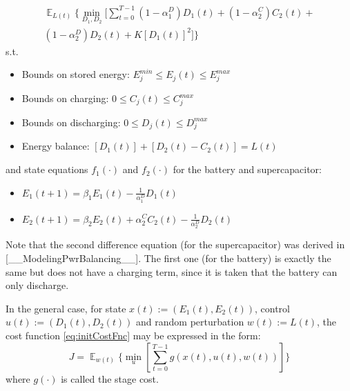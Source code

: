 \documentclass[conference]{IEEEtran}
\DeclareMathOperator{\E}{\mathbb{E}}
\begin{document}
\begin{multline} \label{eq:initCostFnc}
    \mathop{\E}_{L(t)} \Biggl\{\min_{D_{1},D_{2}}[\sum_{t=0}^{T-1}
	(1-\alpha_{1}^{D})D_{1}(t)+
	(1-\alpha_{2}^{C})C_{2}(t)+\\
	(1-\alpha_{2}^{D})D_{2}(t)+
	K\left[D_{1}(t)\right]^{2}
	]\Biggr\}\end{multline}
s.t.
\begin{itemize}
    \item Bounds on stored energy: 
	\begin{math}E_{j}^{min}\leq E_{j}(t)\leq E_{j}^{max}\end{math}
	\item Bounds on charging:
	\begin{math}0\leq C_{j}(t)\leq C_{j}^{max}\end{math}
	\item Bounds on discharging:
	\begin{math}0\leq D_{j}(t)\leq D_{j}^{max}\end{math}
	\item Energy balance:
	\begin{math}\left[D_{1}(t)\right] + \left[D_{2}(t) - C_{2}(t)\right] = L(t)\end{math}
\end{itemize}
and state equations $f_{1}(\cdot)$ and $f_{2}(\cdot)$ for the battery and supercapacitor:
\begin{itemize}
    \item \begin{math}E_{1}(t+1)=\beta_{1}E_{1}(t)-\frac{1}{\alpha_{1}^{D}}D_{1}(t)\end{math}
    \item \begin{math}E_{2}(t+1)=\beta_{2}E_{2}(t)+\alpha_{2}^{C}C_{2}(t)-\frac{1}{\alpha_{2}^{D}}D_{2}(t)\end{math}\newline
\end{itemize}
Note that the second difference equation (for the supercapacitor) was derived in [__ModelingPwrBalancing__]. The first one (for the battery) is exactly the same but does not have a charging term, since it is taken that the battery can only discharge.

In the general case, for state $x(t):= (E_{1}(t),E_{2}(t))$, control $u(t):= (D_{1}(t),D_{2}(t))$ and random perturbation $w(t):= L(t)$, the cost function \eqref{eq:initCostFnc} may be expressed in the form:
\begin{equation}J=\mathop{\E}_{w(t)} \Biggl\{\min_{u}\left[\sum_{t=0}^{T-1}g(x(t),u(t),w(t))\right]\Biggr\}\end{equation}
where $g(\cdot)$ is called the stage cost.
\end{document}
